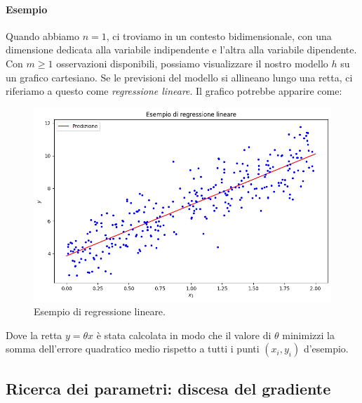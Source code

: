 \documentclass[12pt,a4paper,twoside,openright]{book}
\begin{document}
\paragraph{Esempio}
Quando abbiamo $n=1$, ci troviamo in un contesto bidimensionale, con una dimensione dedicata alla variabile indipendente e l'altra alla variabile dipendente. Con $m \geq 1$ osservazioni disponibili, possiamo visualizzare il nostro modello $h$ su un grafico cartesiano. Se le previsioni del modello si allineano lungo una retta, ci riferiamo a questo come \emph{regressione lineare}. Il grafico potrebbe apparire come:

\begin{figure}[H]
    \centering
    \includegraphics[width=\textwidth]{images/regr_lin.png}
    \caption{Esempio di regressione lineare.}
    \label{fig:lin-reg}
\end{figure}

Dove la retta $y = \theta x$ è stata calcolata in modo che il valore di $\theta$ minimizzi la somma dell'errore quadratico medio rispetto a tutti i punti $(x_i, y_i)$ d'esempio. 


\subsection{Ricerca dei parametri: discesa del gradiente}
\label{gradiente}
\end{document}

